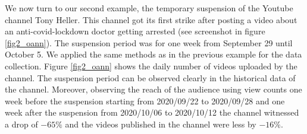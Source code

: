 \documentclass[11pt,a4paper]{article}
\begin{document}
\smallskip


We now turn to our second example, the temporary suspension of the Youtube channel Tony Heller. This channel got its first strike after posting a video about an anti-covid-lockdown doctor getting arrested (see screenshot in figure \ref{fig2_oann}). The suspension period was for one week from September 29 until October 5. We applied the same methods as in the previous example for the data collection. Figure \ref{fig2_oann} shows the daily number of videos uploaded by the channel. The suspension period can be observed clearly in the historical data of the channel. Moreover, observing the reach of the audience using view counts one week before the suspension starting from 2020/09/22 to 2020/09/28 and one week after the suspension from 2020/10/06 to 2020/10/12 the channel witnessed a drop of $-65\%$ and the videos published in the channel were less by $-16\%$.

\end{document}
